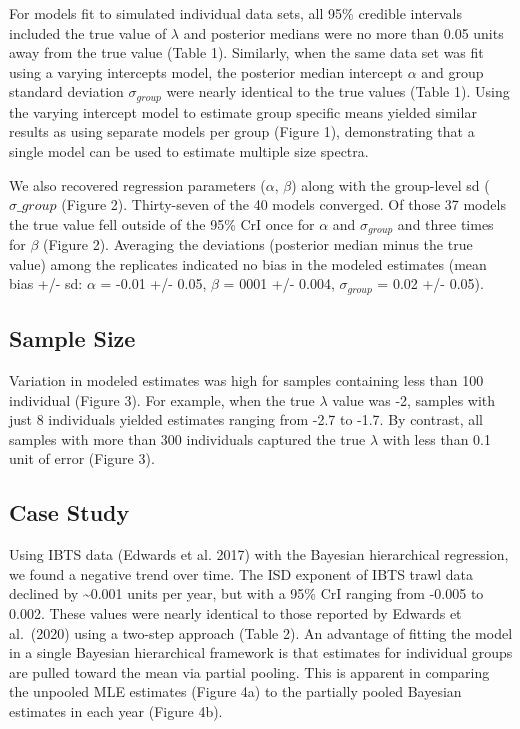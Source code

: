 \documentclass[
  12pt,
]{article}
\numberwithin{equation}
\begin{document}
For models fit to simulated individual data sets, all 95\% credible
intervals included the true value of \(\lambda\) and posterior medians
were no more than 0.05 units away from the true value (Table 1).
Similarly, when the same data set was fit using a varying intercepts
model, the posterior median intercept \(\alpha\) and group standard
deviation \(\sigma_{group}\) were nearly identical to the true values
(Table 1). Using the varying intercept model to estimate group specific
means yielded similar results as using separate models per group (Figure
1), demonstrating that a single model can be used to estimate multiple
size spectra.

We also recovered regression parameters (\(\alpha\), \(\beta\)) along
with the group-level sd (\(\sigma\_{group}\) (Figure 2). Thirty-seven of
the 40 models converged. Of those 37 models the true value fell outside
of the 95\% CrI once for \(\alpha\) and \(\sigma_{group}\) and three
times for \(\beta\) (Figure 2). Averaging the deviations (posterior
median minus the true value) among the replicates indicated no bias in
the modeled estimates (mean bias +/- sd: \(\alpha\) = -0.01 +/- 0.05,
\(\beta\) = 0001 +/- 0.004, \(\sigma_{group}\) = 0.02 +/- 0.05).

\hypertarget{sample-size-1}{%
\subsection{Sample Size}\label{sample-size-1}}

Variation in modeled estimates was high for samples containing less than
100 individual (Figure 3). For example, when the true \(\lambda\) value
was -2, samples with just 8 individuals yielded estimates ranging from
-2.7 to -1.7. By contrast, all samples with more than 300 individuals
captured the true \(\lambda\) with less than 0.1 unit of error (Figure
3).

\hypertarget{case-study}{%
\subsection{Case Study}\label{case-study}}

Using IBTS data (Edwards et al. 2017) with the Bayesian hierarchical
regression, we found a negative trend over time. The ISD exponent of
IBTS trawl data declined by \textasciitilde0.001 units per year, but
with a 95\% CrI ranging from -0.005 to 0.002. These values were nearly
identical to those reported by Edwards et al.~(2020) using a two-step
approach (Table 2). An advantage of fitting the model in a single
Bayesian hierarchical framework is that estimates for individual groups
are pulled toward the mean via partial pooling. This is apparent in
comparing the unpooled MLE estimates (Figure 4a) to the partially pooled
Bayesian estimates in each year (Figure 4b).
\end{document}
